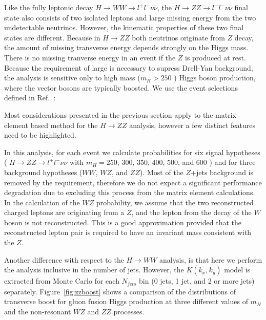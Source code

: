 
Like the fully leptonic decay $H\rightarrow WW \rightarrow l^{+}l^{-}\nu\bar{\nu}$, the $H\rightarrow ZZ\rightarrow l^{+}l^{-}\nu\bar{\nu}$  
final state also consists of two isolated leptons and large missing energy from the two undetectable neutrinos. However, the kinematic properties
of these two final states are different. Because in $H\rightarrow ZZ$ both neutrinos originate from $Z$ decay, the amount of missing transverse 
energy depends strongly on the Higgs mass. There is no missing tranverse energy in an event if the $Z$ is produced at rest. Because the
requirement of large \met 
is necessary to supress Drell-Yan background, the analysis is sensitive only to high mass ($m_{H}>250$ \GeVcc) 
Higgs boson production, where the vector bosons are typically boosted. We use the event selections defined in Ref.~\cite{ref:HWW2011smurf}:

Most considerations presented in the previous section apply to the matrix element based method for the $H\rightarrow ZZ$ analysis,
however a few distinct features need to be highlighted. 

In this analysis, for each event  we calculate probabilities for six signal hypotheses (  $H\rightarrow ZZ\rightarrow l^{+}l^{-}\nu\bar{\nu}$
with $m_{H}=$250, 300, 350, 400, 500, and 600 \GeVcc) and for three background hypotheses ($WW$, $WZ$, and $ZZ$). Most of the
$Z$+jets background is removed by the \met requirement, therefore we do not expect a significant performance degradation due to
excluding this process from the matrix element calculations. In the calculation of the $WZ$ probability, we assume that the two reconstructed
charged leptons are originating from a $Z$, and the lepton from the decay of the $W$ boson is not reconstructed. This is a good 
approximation provided that the reconstructed lepton pair is required to have an invariant mass consistent with the $Z$.

Another difference with respect to the $H\rightarrow WW$ analysis, is that here we perform the analysis inclusive in the number of jets. 
However, the $K(k_x,k_y)$ model is extracted from Monte Carlo for each $N_{jets}$ bin (0 jets, 1 jet, and 2 or more jets) separately. 
Figure~\ref{fig:zzboost} shows a comparison of the distributions of transverse boost for gluon fusion Higgs production 
at three different values of $m_H$ and the non-resonant $WZ$ and $ZZ$ processes.

